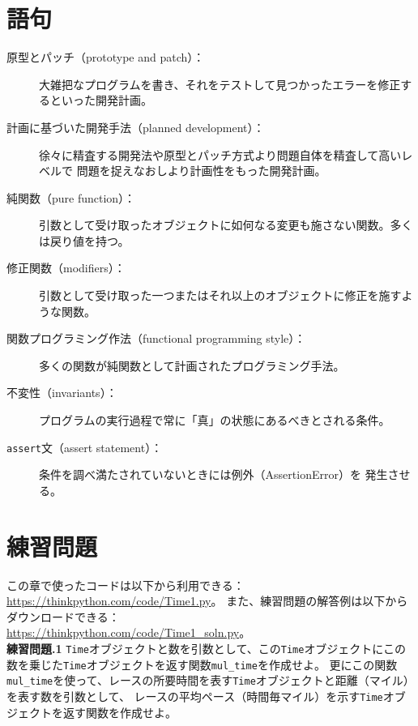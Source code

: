 \documentclass[a4j,12pt,makeidx]{jbook}
\newcommand{\tp}{\thechapter}
\begin{document}
\section{語句}
\begin{description}

\item[原型とパッチ（prototype and patch）：] 大雑把なプログラムを書き、それをテストして見つかったエラーを修正するといった開発計画。

\item[計画に基づいた開発手法（planned development）：] 徐々に精査する開発法や原型とパッチ方式より問題自体を精査して高いレベルで
問題を捉えなおしより計画性をもった開発計画。

\item[純関数（pure function）：] 引数として受け取ったオブジェクトに如何なる変更も施さない関数。多くは戻り値を持つ。

\item[修正関数（modifiers）：] 引数として受け取った一つまたはそれ以上のオブジェクトに修正を施すような関数。

\item[関数プログラミング作法（functional programming style）：] 多くの関数が純関数として計画されたプログラミング手法。

\item[不変性（invariants）：] プログラムの実行過程で常に「真」の状態にあるべきとされる条件。

\item[{\tt assert}文（assert statement）：] 条件を調べ満たされていないときには例外（AssertionError）を
発生させる。 

\end{description}
%
\section{練習問題}
この章で使ったコードは以下から利用できる：\url{https://thinkpython.com/code/Time1.py}。
また、練習問題の解答例は以下からダウンロードできる：\\
\url{https://thinkpython.com/code/Time1_soln.py}。\\

\noindent
{\bf 練習問題\tp.1} {\tt Time}オブジェクトと数を引数として、この{\tt Time}オブジェクトにこの数を乗じた{\tt Time}オブジェクトを返す関数{\tt mul\_time}を作成せよ。
更にこの関数{\tt mul\_time}を使って、レースの所要時間を表す{\tt Time}オブジェクトと距離（マイル）を表す数を引数として、
レースの平均ペース（時間毎マイル）を示す{\tt Time}オブジェクトを返す関数を作成せよ。\\
\end{document}
